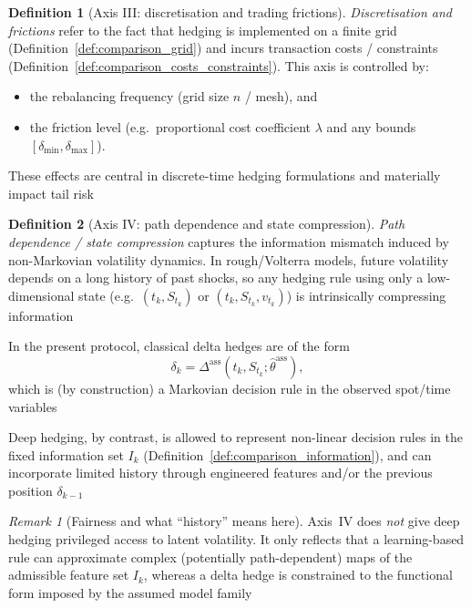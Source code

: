 \documentclass[12pt,a4paper]{article}
\theoremstyle{definition}
\newtheorem{definition}{Definition}[section]
\theoremstyle{plain}
\theoremstyle{remark}
\newtheorem{remark}{Remark}[section]
\theoremstyle{plain}
\begin{document}
\begin{definition}[Axis III: discretisation and trading frictions]
\label{def:axis_discretisation_costs}
\emph{Discretisation and frictions} refer to the fact that hedging is implemented on a finite grid
(Definition~\ref{def:comparison_grid}) and incurs transaction costs / constraints (Definition~\ref{def:comparison_costs_constraints}).
This axis is controlled by:
\begin{itemize}
\item the rebalancing frequency (grid size $n$ / mesh), and
\item the friction level (e.g.\ proportional cost coefficient $\lambda$ and any bounds $[\delta_{\min},\delta_{\max}]$).
\end{itemize}
These effects are central in discrete-time hedging formulations and materially impact tail risk \cite{Buehler2019DeepHedging,FoellmerSchied2016,WhalleyWilmott2002}
\end{definition}

\begin{definition}[Axis IV: path dependence and state compression]
\label{def:axis_state_compression}
\emph{Path dependence / state compression} captures the information mismatch induced by non-Markovian volatility dynamics.
In rough/Volterra models, future volatility depends on a long history of past shocks, so any hedging rule using only a low-dimensional state
(e.g.\ $(t_k,S_{t_k})$ or $(t_k,S_{t_k},v_{t_k})$) is intrinsically compressing information \cite{GatheralRough,BayerFriz2016}

In the present protocol, classical delta hedges are of the form
\[
\delta_k = \Delta^{\mathrm{ass}}(t_k,S_{t_k};\hat\theta^{\mathrm{ass}}),
\]
which is (by construction) a Markovian decision rule in the observed spot/time variables \cite{BlackScholes1973,Heston1993}

Deep hedging, by contrast, is allowed to represent non-linear decision rules in the fixed information set $I_k$ (Definition~\ref{def:comparison_information}),
and can incorporate limited history through engineered features and/or the previous position $\delta_{k-1}$ \cite{Buehler2019DeepHedging,Horvath2021DeepRough}
\end{definition}

\begin{remark}[Fairness and what ``history'' means here]
\label{rem:history_fairness}
Axis~IV does \emph{not} give deep hedging privileged access to latent volatility.
It only reflects that a learning-based rule can approximate complex (potentially path-dependent) maps of the admissible feature set $I_k$,
whereas a delta hedge is constrained to the functional form imposed by the assumed model family \cite{Buehler2019DeepHedging,Horvath2021DeepRough,BlackScholes1973,Heston1993}
\end{remark}
\end{document}
